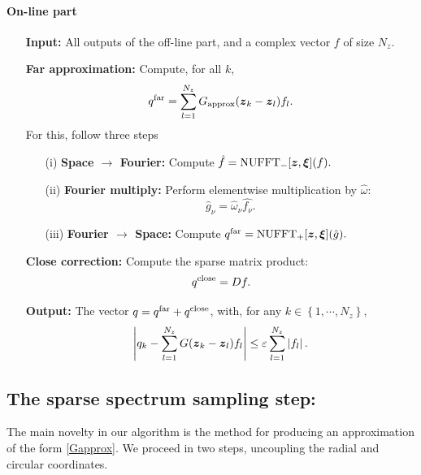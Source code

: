\documentclass{article}
\begin{document}
\paragraph{On-line part}
\begin{itemize}
	\item[] \textbf{Input:} All outputs of the off-line part, and a complex vector $f$ of size $N_z$. 
	\item[] \textbf{Far approximation:} Compute, for all $k$,
	      \begin{equation}
	      	\label{FarApprox}
	      	q^{\text{far}} = \sum_{l=1}^{N_z} G_{\textup{approx}}(\boldsymbol{z}_k - \boldsymbol{z}_l) f_l.
	      \end{equation} 
	      For this, follow three steps
	      \begin{itemize}
	      	\item[(i)] \textbf{Space $\rightarrow$ Fourier: } Compute $\hat{f} = \textup{NUFFT}_-[\boldsymbol{z},\boldsymbol{\xi}](f).$
	      	\item[(ii)] \textbf{Fourier multiply:} Perform elementwise multiplication by $\hat{\omega}$:
	      	\[{\hat{g}_{\nu} = \hat{\omega}_\nu \hat{f_\nu}.}\]
	      	\item[(iii)] \textbf{Fourier $\rightarrow$ Space: } Compute $q^{\text{far}} =  \textup{NUFFT}_+[\boldsymbol{z},\boldsymbol{\xi}](\hat{g}).$
	      \end{itemize}
	\item[] \textbf{Close correction:} Compute the sparse matrix product:
	      \[q^{\textup{close}} = Df.\]
	\item[] \textbf{Output:} The vector $q = q^{\textup{far}} + q^{\textup{close}}$, with, for any $k \in \left\{1,\cdots,N_z\right\},$	
	      \[ \left\lvert q_k - \sum_{l = 1}^{N_z} G({\boldsymbol{z}_k - \boldsymbol{z}_l}) f_l \right\rvert \leq \varepsilon \sum_{l=1}^{N_z} \left\lvert f_l \right\rvert.\]
\end{itemize}

\subsection*{\textbf{The sparse spectrum sampling step:}}
The main novelty in our algorithm is the method for producing an approximation of the form \eqref{Gapprox}. We proceed in two steps, uncoupling the radial and circular coordinates. 
\end{document}
